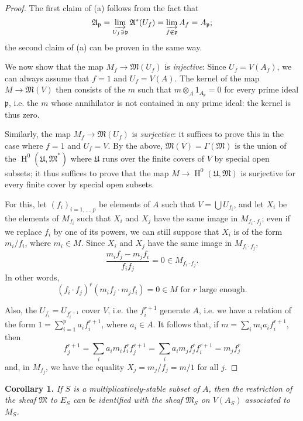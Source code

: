\documentclass{article}
\newenvironment{itenv}[1]
  {\phantomsection\par\medskip\noindent\textbf{#1.}\itshape}
  {\medskip}
\DeclareMathOperator{\HH}{H}
\newcommand{\oldpage}[1]{\marginpar{\footnotesize$\Big\vert$ \textit{p.~#1}}}
\begin{document}
\begin{proof}
  The first claim of (a) follows from the fact that
  \[
    \mathfrak{A}_\mathfrak{p}
    = \varinjlim_{U_f\ni\mathfrak{p}} \mathfrak{A}^*(U_f)
    = \varinjlim_{f\not\in\mathfrak{p}} A_f
    = A_\mathfrak{p};
  \]
  the second claim of (a) can be proven in the same way.

  We now show that the map $M_f\to\mathfrak{M}(U_f)$ is \emph{injective}:
  Since $U_f=V(A_f)$, we can always assume that $f=1$ and $U_f=V(A)$.
  The kernel of the map $M\to\mathfrak{M}(V)$ then consists of the $m$ such that $m\otimes_A1_{A_\mathfrak{p}}=0$ for every prime ideal $\mathfrak{p}$, i.e. the $m$ whose annihilator is not contained in any prime ideal:
  the kernel is thus zero.

  Similarly, the map $M_f\to\mathfrak{M}(U_f)$ is \emph{surjective}:
  it suffices to prove this in the case where $f=1$ and $U_f=V$.
  By the above, $\mathfrak{M}(V)=\Gamma(\mathfrak{M})$ is the union of the $\HH^0(\mathfrak{U},\mathfrak{M}^*)$ where $\mathfrak{U}$ runs over the finite covers of $V$ by special open subsets;
  it thus suffices to prove that the map $M\to\HH^0(\mathfrak{U},\mathfrak{M})$ is surjective for every finite cover by special open subsets.

  For this, let $(f_i)_{i=1,\ldots,p}$ be elements of $A$ such that $V=\bigcup U_{f_i}$, and let $X_i$ be the elements of $M_{f_i}$ such that $X_i$ and $X_j$ have the same image in $M_{f_i\cdot f_j}$;
  even if we replace $f_i$ by one of its powers, we can still suppose that $X_i$ is of the form $m_i/f_i$, where $m_i\in M$.
  Since $X_i$ and $X_j$ have the same image in $M_{f_i\cdot f_j}$,
  \[
    \frac{m_i f_j - m_j f_i}{f_i f_j} = 0 \in M_{f_i\cdot f_j}.
  \]
\oldpage{1-06}
  In other words,
  \[
    (f_i\cdot f_j)^r(m_if_j\cdot m_jf_i) = 0 \in M\mbox{ for $r$ large enough.}
  \]

  Also, the $U_{f_i}=U_{f_i^{r+1}}$ cover $V$, i.e. the $f_i^{r+1}$ generate $A$, i.e. we have a relation of the form $1=\sum_{i=1}^p a_i f_i^{r+1}$, where $a_i\in A$.
  It follows that, if $m=\sum_i m_ia_if_i^{r+1}$, then
  \[
    f_j^{r+1}
    = \sum_i a_im_if_i^rf_j^{r+1}
    = \sum_i a_im_jf_j^rf_i^{r+1}
    = m_jf_j^r
  \]
  and, in $M_{f_j}$, we have the equality $X_j=m_j/f_j=m/1$ for all $j$.
\end{proof}

\begin{itenv}{Corollary 1}
\label{corollary1}
  If $S$ is a multiplicatively-stable subset of $A$, then the restriction of the sheaf $\mathfrak{M}$ to $E_S$ can be identified with the sheaf $\mathfrak{M}_S$ on $V(A_S)$ associated to $M_S$.
\end{itenv}
\end{document}
